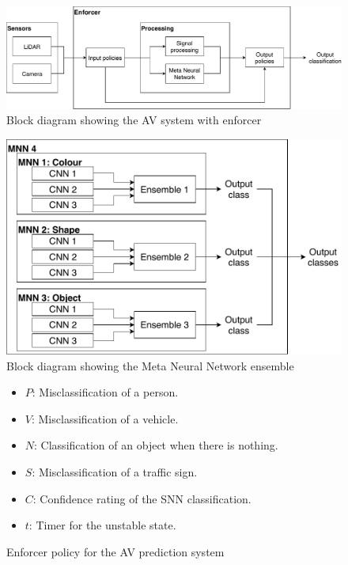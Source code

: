 \begin{figure}[t]
	\centering
	\includegraphics[scale=0.6]{Content/fig/SSNN.pdf}
	\caption{Block diagram showing the AV system with enforcer}
	\label{fig:ssnn}
\end{figure}

\begin{figure}[h]
	\centering
	\includegraphics[scale=0.9]{Content/fig/MNN.pdf}
	\caption{Block diagram showing the Meta Neural Network ensemble} \label{fig:mnn}
\end{figure}

\begin{figure}[t]
	\centering
	\scalebox{1.3}{}

	\begin{itemize}
		\item $P$: Misclassification of a person.
		\item $V$: Misclassification of a vehicle.
		\item $N$: Classification of an object when there is nothing.
		\item $S$: Misclassification of a traffic sign.
		\item $C$: Confidence rating of the \ac{SNN} classification.
		\item $t$: Timer for the unstable state.
	\end{itemize}
	
	\caption{Enforcer policy for the AV prediction system}
	\label{fig:signrte}
\end{figure}

















